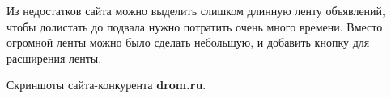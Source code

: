 \noindent
\begin{minipage}{\linewidth}
\end{minipage}
\bigskip

Из недостатков сайта можно выделить слишком длинную ленту объявлений, чтобы долистать до подвала нужно потратить очень много времени. Вместо огромной ленты можно было сделать небольшую, и добавить кнопку для расширения ленты.

Скриншоты сайта-конкурента \textbf{drom.ru}.

\noindent
\begin{minipage}{\linewidth}
\end{minipage}
\bigskip

